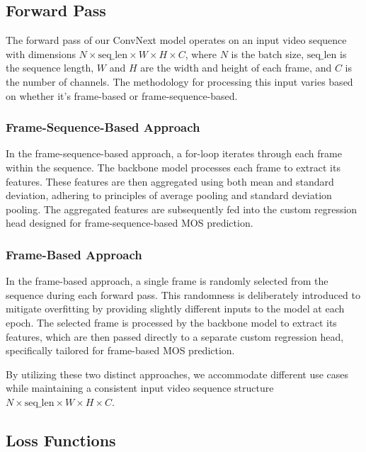 \documentclass[a4paper,12pt,openright]{book}
\begin{document}
\subsection{Forward Pass}

The forward pass of our ConvNext model operates on an input video sequence with dimensions \(N \times \text{seq\_len} \times W \times H \times C\), where \(N\) is the batch size, \(\text{seq\_len}\) is the sequence length, \(W\) and \(H\) are the width and height of each frame, and \(C\) is the number of channels. The methodology for processing this input varies based on whether it's frame-based or frame-sequence-based.

\subsubsection{Frame-Sequence-Based Approach}
\label{frame:based}

In the frame-sequence-based approach, a for-loop iterates through each frame within the sequence. The backbone model processes each frame to extract its features. These features are then aggregated using both mean and standard deviation, adhering to principles of average pooling and standard deviation pooling. The aggregated features are subsequently fed into the custom regression head designed for frame-sequence-based MOS prediction.

\subsubsection{Frame-Based Approach}

In the frame-based approach, a single frame is randomly selected from the sequence during each forward pass. This randomness is deliberately introduced to mitigate overfitting by providing slightly different inputs to the model at each epoch. The selected frame is processed by the backbone model to extract its features, which are then passed directly to a separate custom regression head, specifically tailored for frame-based MOS prediction.

By utilizing these two distinct approaches, we accommodate different use cases while maintaining a consistent input video sequence structure \(N \times \text{seq\_len} \times W \times H \times C\).

\subsection{Loss Functions}
\end{document}
